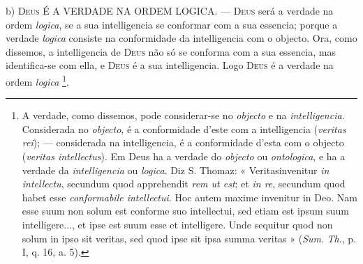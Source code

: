 b) \textsc{Deus} É A VERDADE NA ORDEM LOGICA. --- \textsc{Deus} será a verdade na ordem \emph{logica}, se a sua intelligencia se conformar com a sua essencia; porque a verdade \emph{logica} consiste na conformidade da intelligencia com o objecto. Ora, como dissemos, a intelligencia de \textsc{Deus} não só se conforma com a sua essencia, mas identifica-se com ella, e \textsc{Deus} é a sua intelligencia. Logo \textsc{Deus} é a verdade na ordem \emph{logica} \footnote{A verdade, como dissemos, pode considerar-se no \emph{objecto} e na \emph{intelligencia}. Considerada no \emph{objecto}, é a conformidade d'este com a intelligencia (\emph{veritas rei}); --- considerada na intelligencia, é a conformidade d'esta com o objecto (\emph{veritas intellectus}). Em Deus ha a verdade do \emph{objecto} ou \emph{ontologica}, e ha a verdade da \emph{intelligencia} ou \emph{logica}. Diz S. Thomaz: « Veritasinvenitur \emph{in intellectu}, secundum quod apprehendit \emph{rem ut est}; et \emph{in re}, secundum quod habet esse \emph{conformabile intellectui}. Hoc autem maxime invenitur in Deo. Nam esse suum non solum est conforme suo intellectui, sed etiam est ipsum suum intelligere..., et ipse est suum esse et intelligere. Unde sequitur quod non solum in ipso sit veritas, sed quod ipse sit ipsa summa veritas » (\emph{Sum}. \emph{Th}., p. I, q. 16, a. 5).}.

